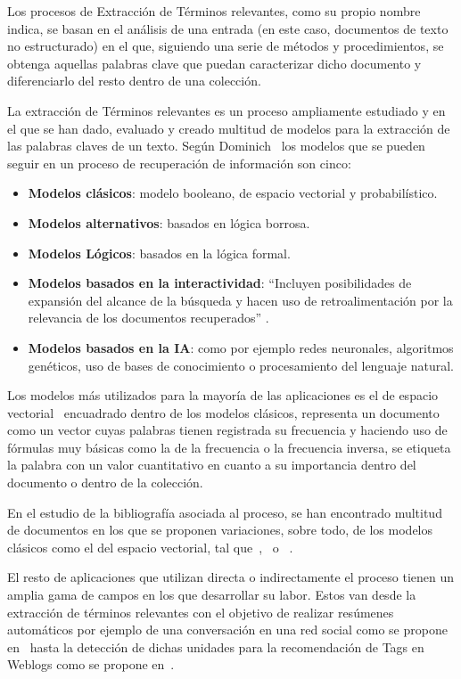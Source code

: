 \documentclass[runningheads,a4paper]{llncs}
\theoremstyle{break}
\begin{document}
Los procesos de Extracción de Términos relevantes, como su propio nombre indica, se basan en el análisis de una entrada (en este caso, documentos de texto no estructurado) en el que, siguiendo una serie de métodos y procedimientos, se obtenga aquellas palabras clave que puedan caracterizar dicho documento y diferenciarlo del resto dentro de una colección.

La extracción de Términos relevantes es un proceso ampliamente estudiado y en el que se han dado, evaluado y creado multitud de modelos para la extracción de las palabras claves de un texto. Según Dominich~\cite{topterms:1} los modelos que se pueden seguir en un proceso de recuperación de información son cinco:

\begin{itemize}
	\item \textbf{Modelos clásicos}: modelo booleano, de espacio vectorial y probabilístico.
    \item \textbf{Modelos alternativos}: basados en lógica borrosa.
    \item \textbf{Modelos Lógicos}: basados en la lógica formal.
    \item \textbf{Modelos basados en la interactividad}: ``Incluyen posibilidades de expansión del alcance de la búsqueda y hacen uso de retroalimentación por la relevancia de los documentos recuperados'' \cite{topterms:2}.
    \item \textbf{Modelos basados en la IA}: como por ejemplo redes neuronales, algoritmos genéticos, uso de bases de conocimiento o procesamiento del lenguaje natural.
\end{itemize}

Los modelos más utilizados para la mayoría de las aplicaciones es el de espacio vectorial~\cite{topterms:3} encuadrado dentro de los modelos clásicos, representa un documento como un vector cuyas palabras tienen registrada su frecuencia y haciendo uso de fórmulas muy básicas como la de la frecuencia o la frecuencia inversa, se etiqueta la palabra con un valor cuantitativo en cuanto a su importancia dentro del documento o dentro de la colección.

En el estudio de la bibliografía asociada al proceso, se han encontrado multitud de documentos en los que se proponen variaciones, sobre todo, de los modelos clásicos como el del espacio vectorial, tal que~\cite{topterms:4},~\cite{topterms:5} o ~\cite{topterms:6}.

El resto de aplicaciones que utilizan directa o indirectamente el proceso tienen un amplia gama de campos en los que desarrollar su labor. Estos van desde la extracción de términos relevantes con el objetivo de realizar resúmenes automáticos por ejemplo de una conversación en una red social como se propone en~\cite{topterms:7} hasta la detección de dichas unidades para la recomendación de Tags en Weblogs como se propone en~\cite{topterms:8}.
\end{document}
